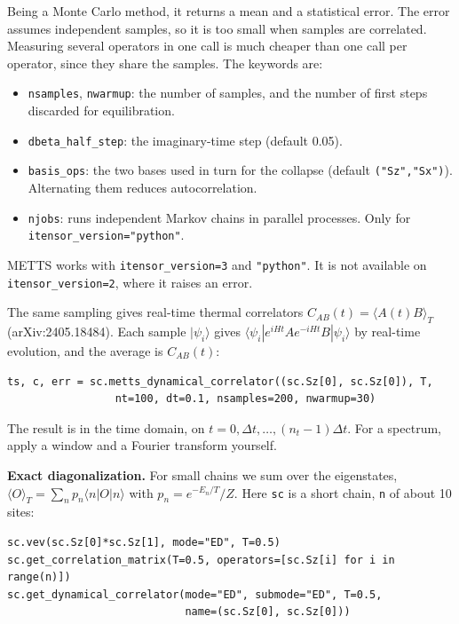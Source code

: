 \documentclass[11pt]{article}
\providecommand{\tightlist}{\setlength{\itemsep}{0pt}\setlength{\parskip}{0pt}}
\begin{document}
Being a Monte Carlo method, it returns a mean and a statistical error.
The error assumes independent samples, so it is too small when samples
are correlated. Measuring several operators in one call is much cheaper
than one call per operator, since they share the samples. The keywords
are:

\begin{itemize}
\tightlist
\item
  \texttt{nsamples}, \texttt{nwarmup}: the number of samples, and the number of first
  steps discarded for equilibration.
\item
  \texttt{dbeta\_\allowbreak{}half\_\allowbreak{}step}: the imaginary-time step (default 0.05).
\item
  \texttt{basis\_\allowbreak{}ops}: the two bases used in turn for the collapse (default
  \texttt{("Sz","Sx")}). Alternating them reduces autocorrelation.
\item
  \texttt{njobs}: runs independent Markov chains in parallel processes. Only
  for \texttt{itensor\_\allowbreak{}version="python"}.
\end{itemize}

METTS works with \texttt{itensor\_\allowbreak{}version=3} and \texttt{"python"}. It is not available
on \texttt{itensor\_\allowbreak{}version=2}, where it raises an error.

The same sampling gives real-time thermal correlators
\(C_{AB}(t)=\langle A(t)B\rangle_T\) (arXiv:2405.18484). Each sample
\(|\psi_i\rangle\) gives \(\langle\psi_i|e^{iHt}Ae^{-iHt}B|\psi_i\rangle\) by
real-time evolution, and the average is \(C_{AB}(t)\):

\begin{lstlisting}
ts, c, err = sc.metts_dynamical_correlator((sc.Sz[0], sc.Sz[0]), T,
                 nt=100, dt=0.1, nsamples=200, nwarmup=30)
\end{lstlisting}

The result is in the time domain, on \(t=0,\Delta t,\dots,(n_t-1)\Delta t\).
For a spectrum, apply a window and a Fourier transform yourself.

\textbf{Exact diagonalization.} For small chains we sum over the eigenstates,
\(\langle O\rangle_T=\sum_n p_n\langle n|O|n\rangle\) with
\(p_n=e^{-E_n/T}/Z\). Here \texttt{sc} is a short chain, \texttt{n} of about 10 sites:

\begin{lstlisting}
sc.vev(sc.Sz[0]*sc.Sz[1], mode="ED", T=0.5)
sc.get_correlation_matrix(T=0.5, operators=[sc.Sz[i] for i in range(n)])
sc.get_dynamical_correlator(mode="ED", submode="ED", T=0.5,
                            name=(sc.Sz[0], sc.Sz[0]))
\end{lstlisting}
\end{document}
